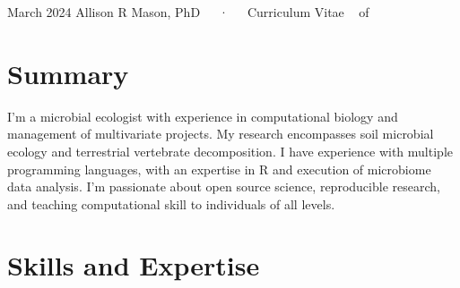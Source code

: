 \documentclass[11pt,a4paper,]{awesome-cv}
\begin{document}
\makecvheader

\makecvfooter
  {March 2024}
    { Allison R Mason, PhD~~~·~~~Curriculum Vitae}
  {\thepage~ of \pageref{LastPage}~}





\makeatletter
\def\@sectioncolor{\color{awesome}}
\makeatother


\hypertarget{summary}{%
\section{Summary}\label{summary}}

I'm a microbial ecologist with experience in computational biology and
management of multivariate projects. My research encompasses soil
microbial ecology and terrestrial vertebrate decomposition. I have
experience with multiple programming languages, with an expertise in R
and execution of microbiome data analysis. I'm passionate about open
source science, reproducible research, and teaching computational skill
to individuals of all levels.

\hypertarget{skills-and-expertise}{%
\section{\texorpdfstring{\faCogs Skills and
Expertise}{Skills and Expertise}}\label{skills-and-expertise}}
\end{document}
